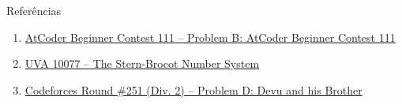 \begin{frame}[fragile]{Referências}

    \begin{enumerate}
        \item \href{https://atcoder.jp/contests/abc111/tasks/abc111_b}{AtCoder Beginner
            Contest 111 -- Problem B: AtCoder Beginner Contest 111}

        \item \href{https://uva.onlinejudge.org/index.php?option=com_onlinejudge&Itemid=8&category=24&page=show_problem&problem=1018}{UVA 10077 -- The Stern-Brocot Number System}

        \item \href{https://codeforces.com/problemset/problem/439/D}{Codeforces Round \#251 (Div. 2) -- Problem D: Devu and his Brother}
    \end{enumerate}

\end{frame}
